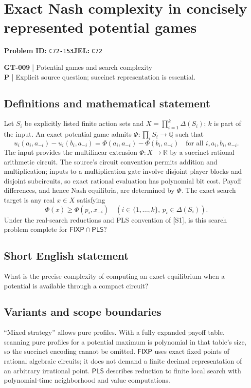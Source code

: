 \documentclass[11pt,a4paper]{article}
\begin{document}
\section*{Exact Nash complexity in concisely represented potential games}
\textbf{Problem ID:} \texttt{C72-153}\quad \textbf{JEL:} \texttt{C72}\par
\label{problem:OP-0139}
\label{game:GT-009}
{\sffamily\small\color{muted}
\textbf{GT-009} | Potential games and search complexity\\
\textbf{P} | Explicit source question; succinct representation is essential.
\par}
\subsection*{Definitions and mathematical statement}
Let $S_i$ be explicitly listed finite action sets and $X=\prod_{i=1}^k\Delta(S_i)$; $k$ is part of the input. An exact potential game admits $\Phi:\prod_iS_i\to\mathbb Q$ such that
\[
 u_i(a_i,a_{-i})-u_i(b_i,a_{-i})
 =\Phi(a_i,a_{-i})-\Phi(b_i,a_{-i})
 \quad\text{for all }i,a_i,b_i,a_{-i}.
\]
The input provides the multilinear extension $\Phi:X\to\mathbb R$ by a succinct rational arithmetic circuit. The source's circuit convention permits addition and multiplication; inputs to a multiplication gate involve disjoint player blocks and disjoint subcircuits, so exact rational evaluation has polynomial bit cost. Payoff differences, and hence Nash equilibria, are determined by $\Phi$.
The exact search target is any real $x\in X$ satisfying
\[
 \Phi(x)\geq\Phi(p_i,x_{-i})\quad
 (i\in\{1,\ldots,k\},\ p_i\in\Delta(S_i)).
\]
Under the real-search reductions and PLS convention of [S1], is this search problem complete for $\mathsf{FIXP}\cap\mathsf{PLS}$?
\subsection*{Short English statement}
What is the precise complexity of computing an exact equilibrium when a potential is available through a compact circuit?
\subsection*{Variants and scope boundaries}
``Mixed strategy'' allows pure profiles. With a fully expanded payoff table, scanning pure profiles for a potential maximum is polynomial in that table's size, so the succinct encoding cannot be omitted. $\mathsf{FIXP}$ uses exact fixed points of rational algebraic circuits; it does not demand a finite decimal representation of an arbitrary irrational point. $\mathsf{PLS}$ describes reduction to finite local search with polynomial-time neighborhood and value computations.
\end{document}
